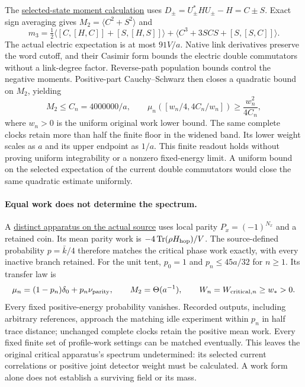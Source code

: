 The \href{https://github.com/FloatingPragma/observer-patch-holography/blob/main/model/particle_primary_weighted_spectral_tail/PROOF.md}{selected-state moment calculation}
uses $D_\pm=U_\pm^*HU_\pm-H=C\pm S$. Exact sign averaging gives
$M_2=\langle C^2+S^2\rangle$ and
\[
 m_3=\tfrac12\langle[C,[H,C]]+[S,[H,S]]\rangle
       +\langle C^3+3SCS+[S,[S,C]]\rangle.
\]
The actual electric expectation is at most $91V/a$. Native link
derivatives preserve the word cutoff, and their Casimir form bounds the
electric double commutators without a link-degree factor. Reverse-path
population bounds control the negative moments. Positive-part
Cauchy--Schwarz then closes a quadratic bound on $M_2$, yielding
\[
 M_2\le C_n=4000000/a,\qquad
 \mu_n([w_n/4,4C_n/w_n])\ge\frac{w_n^2}{4C_n},
\]
where $w_n>0$ is the uniform original work lower bound. The same complete
clocks retain more than half the finite floor in the widened band.
Its lower weight scales as $a$ and its upper endpoint as $1/a$.
This finite readout holds without proving uniform integrability or a
nonzero fixed-energy limit. A uniform bound on the selected expectation
of the current double commutators would close the same quadratic
estimate uniformly.

\paragraph{Equal work does not determine the spectrum.}
A \href{https://github.com/FloatingPragma/observer-patch-holography/blob/main/model/particle_primary_equal_work_control/PROOF.md}{distinct apparatus on the actual source}
uses local parity $P_x=(-1)^{N_x}$ and a retained coin. Its mean parity
work is $-4\operatorname{Tr}(\rho H_{\rm hop})/V$. The source-defined
probability $p=\bar k/4$ therefore matches the critical phase work
exactly, with every inactive branch retained. For the unit tent,
$p_0=1$ and $p_n\le45a/32$ for $n\ge1$. Its transfer law is
\[
 \mu_n=(1-p_n)\delta_0+p_n\nu_{\rm parity},\qquad
 M_2=\Theta(a^{-1}),\qquad W_n=W_{{\rm critical},n}\ge w_*>0.
\]
Every fixed positive-energy probability vanishes. Recorded outputs,
including arbitrary references, approach the matching idle experiment
within $p_n$ in half trace distance; unchanged complete clocks retain
the positive mean work. Every fixed finite set of profile-work settings
can be matched eventually. This leaves the original critical apparatus's
spectrum undetermined: its selected current correlations or positive
joint detector weight must be calculated. A work form alone does not
establish a surviving field or its mass.

